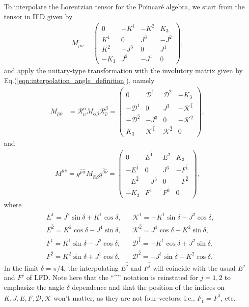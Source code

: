 \documentclass[foundations,article,submit,pdftex,moreauthors]{Definitions/mdpi}
\newcommand{\muT}{\hat{\mu}}
\newcommand{\nuT}{\hat{\nu}}
\newcommand{\itP}[1]{\hat{#1}}
\begin{document}
To interpolate the Lorentzian tensor for the Poincar\'e algebra, we start from the tensor in IFD given by 
\begin{align}\label{eqn:J_mu_nu_IF}
  M_{\mu\nu}=\begin{pmatrix}
     0&-K^1&-K^2&K_3\\
     K^1&0&J^3&-J^2\\
     K^2&-J^3&0&J^1\\
     -K_3&J^2&-J^1&0 
     \end{pmatrix} ,
\end{align}
and apply the unitary-type transformation with the involutory matrix given by Eq.(\ref{eqn:interpolation_angle_definition}), namely
\begin{align}\label{eqn:Poincare_Matrix_Interpolation_superscripts}
  M_{\muT\nuT}
  &=\mathcal{R}_{\hat{\mu}}^{{\alpha}}M_{\alpha\beta}\mathcal{R}_{\hat{\nu}}^{{\beta}}=\begin{pmatrix}
    0 & {\mathcal{D}}^{\itP{1}} & {\mathcal{D}}^{\itP{2}} & -K_3\\
    -{\mathcal{D}}^{\itP{1}} & 0 & {J}^{3} & -{\mathcal{K}}^{\itP{1}}\\
    -{\mathcal{D}}^{\itP{2}} & -{J}^{3} & 0 & -{\mathcal{K}}^{\itP{2}}\\
    K_3 & {\mathcal{K}}^{\itP{1}} & {\mathcal{K}}^{\itP{2}} & 0
  \end{pmatrix},
\end{align}
and
\begin{align}
  M^{\muT\nuT}
  =
  g^{\muT\itP{\alpha}}M_{\itP{\alpha}\itP{\beta}}g^{\itP{\beta}\nuT}
  =
  \begin{pmatrix}
    0 & {E}^{\itP{1}} & {E}^{\itP{2}} & K_3\\
    -{E}^{\itP{1}} & 0 & {J}^{3} & -{F}^{\itP{1}}\\
    -{E}^{\itP{2}} & -{J}^{3} & 0 & -{F}^{\itP{2}}\\
    -K_3 & {F}^{\itP{1}} & {F}^{\itP{2}} & 0
  \end{pmatrix} ,
\end{align}
where
\begin{align}\label{eqn:E_F_D_K_Definition_Interpolation_Angle}
  &E^{\itP{1}}=J^{2}\sin\delta+K^{1}\cos\delta,
  &&\mathcal{K}^{\itP{1}}=-K^{1}\sin\delta-J^{2}\cos\delta, \nonumber\\
  &E^{\itP{2}}=K^{2}\cos\delta-J^{1}\sin\delta,
  &&\mathcal{K}^{\itP{2}}=J^{1}\cos\delta-K^{2}\sin\delta, \nonumber\\
  &F^{\itP{1}}=K^{1}\sin\delta-J^{2}\cos\delta,
  &&\mathcal{D}^{\itP{1}}=-K^{1}\cos\delta+J^{2}\sin\delta, \nonumber\\
  &F^{\itP{2}}=K^{2}\sin\delta+J^{1}\cos\delta,
  &&\mathcal{D}^{\itP{2}}=-J^{1}\sin\delta-K^{2}\cos\delta.
\end{align}
In the limit $\delta=\pi/4$, the interpolating $E^{\itP{j}}$ and $F^{\itP{j}}$ will coincide with the usual $E^{j}$ and $F^{j}$ of LFD.
Note here that the ``\textasciicircum'' notation is reinstated for $j=1, 2$ to emphasize the angle $\delta$ dependence and that the position of the indices on $K, J, E, F, \mathcal{D}, \mathcal{K}$ won't matter, as they are not four-vectors: i.e., $F_{\itP{1}}=F^{\itP{1}}$, etc.
\end{document}
